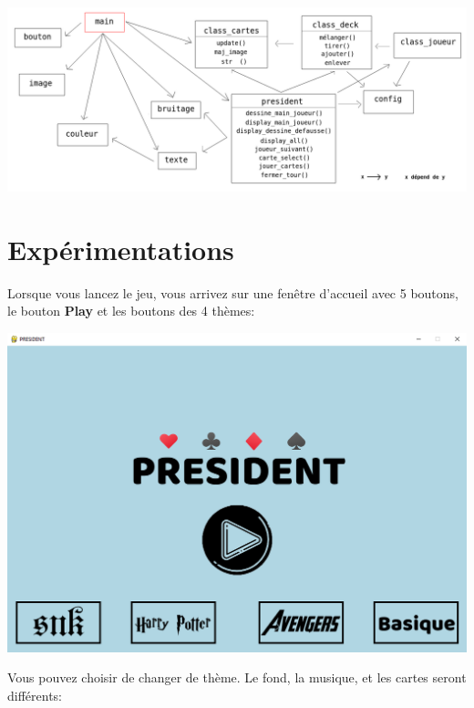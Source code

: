 \documentclass[french,12pt]{article}
\begin{document}
\begin{center}
	\includegraphics[scale=0.3]{img/diagramme_classes.png}	
\end{center}


\section{Expérimentations}

Lorsque vous lancez le jeu, vous arrivez sur une fenêtre d'accueil avec 5 boutons, le bouton \textbf{Play} et les boutons des 4 thèmes:

\begin{center}
	\includegraphics[scale=0.4]{img/accueil.png}
\end{center}

Vous pouvez choisir de changer de thème. Le fond, la musique, et les cartes seront différents:
\end{document}
